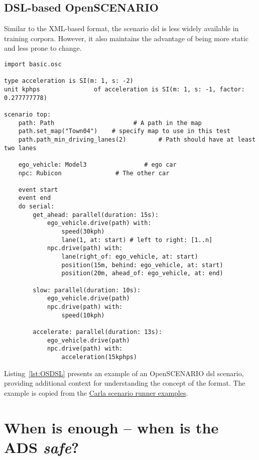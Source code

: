 \subsection{DSL-based OpenSCENARIO}

Similar to the XML-based format, the scenario \acrshort{dsl} is less widely available in training corpora. However, it also maintains the advantage of being more static and less prone to change.


\begin{lstlisting}[label={lst:OSDSL}, caption={An example of an OpenSCENARIO DSL scenario.}]
import basic.osc

type acceleration is SI(m: 1, s: -2)
unit kphps               of acceleration is SI(m: 1, s: -1, factor: 0.277777778)

scenario top:
    path: Path                      # A path in the map
    path.set_map("Town04")    # specify map to use in this test
    path.path_min_driving_lanes(2)         # Path should have at least two lanes

    ego_vehicle: Model3                # ego car
    npc: Rubicon               # The other car

    event start
    event end
    do serial:
        get_ahead: parallel(duration: 15s):
            ego_vehicle.drive(path) with:
                speed(30kph)
                lane(1, at: start) # left to right: [1..n]
            npc.drive(path) with:
                lane(right_of: ego_vehicle, at: start)
                position(15m, behind: ego_vehicle, at: start)
                position(20m, ahead_of: ego_vehicle, at: end)       

        slow: parallel(duration: 10s):
            ego_vehicle.drive(path)
            npc.drive(path) with:
                speed(10kph)

        accelerate: parallel(duration: 13s):
            ego_vehicle.drive(path)
            npc.drive(path) with:
                acceleration(15kphps)
\end{lstlisting}

Listing~\ref{lst:OSDSL} presents an example of an OpenSCENARIO \acrshort{dsl} scenario, providing
additional context for understanding the concept of the format. The example is copied
from the \href{https://github.com/carla-simulator/scenario_runner/blob/master/srunner/examples/acceleration.osc}{Carla scenario runner examples}.

\section{When is enough -- when is the ADS \emph{safe}?}

